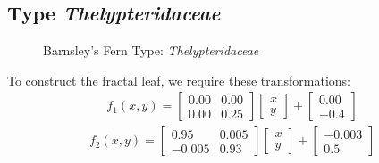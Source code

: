 \documentclass{article}
\begin{document}
\subsection{Type \textit{Thelypteridaceae}}

\begin{figure}[H]
\centering 
\noindent{}%
\caption{Barnsley's Fern Type: \textit{Thelypteridaceae}}
\end{figure}
To construct the fractal leaf, we require these transformations:
\begin{gather}
f_1(x, y)=\begin{bmatrix}0.00 & 0.00 \\ 0.00 & 0.25 \end{bmatrix}\begin{bmatrix}x\\y\end{bmatrix} + \begin{bmatrix}0.00\\-0.4\end{bmatrix}
\end{gather}
\begin{gather}
f_2(x, y)=\begin{bmatrix}0.95 & 0.005 \\ -0.005 & 0.93 \end{bmatrix}\begin{bmatrix}x\\y\end{bmatrix} + \begin{bmatrix}-0.003\\0.5\end{bmatrix}
\end{gather}
\end{document}
